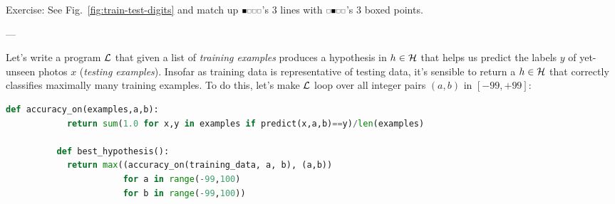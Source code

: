 \documentclass[11pt, justified]{tufte-book}
\newcommand{\offourline}[1]{
    {\tiny \raisebox{0.04cm}{\scalebox{0.9}{$\substack{
        \IfSubStr{#1}{0}{{\blacksquare}}{\square}   
        \IfSubStr{#1}{1}{{\blacksquare}}{\square}
        \IfSubStr{#1}{2}{{\blacksquare}}{\square}   
        \IfSubStr{#1}{3}{{\blacksquare}}{\square}   
    }$}}}%
}
\newcommand{\attn}[1]{{\bro \textsf{#1}}}
\newcommand{\plainfootprint}{}
\newcommand{\footprint}{\marginnote{\plainfootprint} }
\newcommand{\sampassage}[1]{
   \vspace{0.1cm}
   \par\noindent{\hspace{-2cm}\normalsize \sc \gre #1} ---
}
\theoremstyle{definition}
\begin{document}
        \noindent
        \attn{Exercise:} {See Fig.\ \ref{fig:train-test-digits} and match up $\offourline{0}$'s $3$ lines with
        $\offourline{1}$'s $3$ boxed points.}\footprint


      \sampassage{optimization}
        Let's write a program $\mathcal{L}$ that given a list of \emph{training
        examples} produces a hypothesis in $h \in \mathcal{H}$ that helps us predict
        the labels $y$ of yet-unseen photos $x$ (\emph{testing examples}).
        Insofar as training data is representative of testing data, it's
        sensible to return a $h\in \mathcal{H}$ that correctly classifies maximally
        many training examples.\footprint
        To do this, let's make $\mathcal{L}$ loop over all integer pairs $(a,b)$ in
        $[-99,+99]$:  %
        \begin{lstlisting}[language=Python, basicstyle=\footnotesize\ttfamily]
          def accuracy_on(examples,a,b):
            return sum(1.0 for x,y in examples if predict(x,a,b)==y)/len(examples)

          def best_hypothesis():
            return max((accuracy_on(training_data, a, b), (a,b))
                       for a in range(-99,100) 
                       for b in range(-99,100))
        \end{lstlisting}
\end{document}
